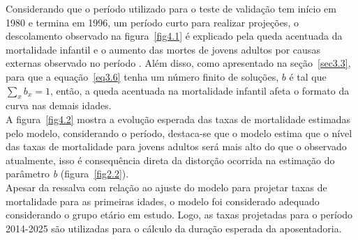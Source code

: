 \documentclass[12pt, 						%
			openright, 					%
			twoside,					%
			a4paper,x					%
			english,					%
			brazil]{abntex2}				%
\begin{document}
	Considerando que o período utilizado para o teste de validação tem início em 1980 e termina em 1996, um período curto para realizar projeções, o descolamento observado na figura~\ref{fig4.1} é explicado pela queda acentuada da mortalidade infantil e o aumento das mortes de jovens adultos por causas externas observado no período \cite{waiselfisz2011mapa, duarte2012associaccao, carvalho2012bayesian}. Além disso, como apresentado na seção~\ref{sec3.3}, para que a equação~\ref{eq3.6} tenha um número finito de soluções, $b$ é tal que $\sum_{x}b_{x} = 1$, então, a queda acentuada na mortalidade infantil afeta o formato da curva nas demais idades.\\
	A figura~\ref{fig4.2} mostra a evolução esperada das taxas de mortalidade estimadas pelo modelo, considerando o período, destaca-se que o modelo estima que o nível das taxas de mortalidade para jovens adultos será mais alto do que o observado atualmente, isso é consequência direta da distorção ocorrida na estimação do parâmetro \textit{b} (figura~\ref{fig2.2}). \\
	Apesar da ressalva com relação ao ajuste do modelo para projetar taxas de mortalidade para as primeiras idades, o modelo foi considerado adequado considerando o grupo etário em estudo. Logo, as taxas projetadas para o período 2014-2025 são utilizadas para o cálculo da duração esperada da aposentadoria.
\end{document}
